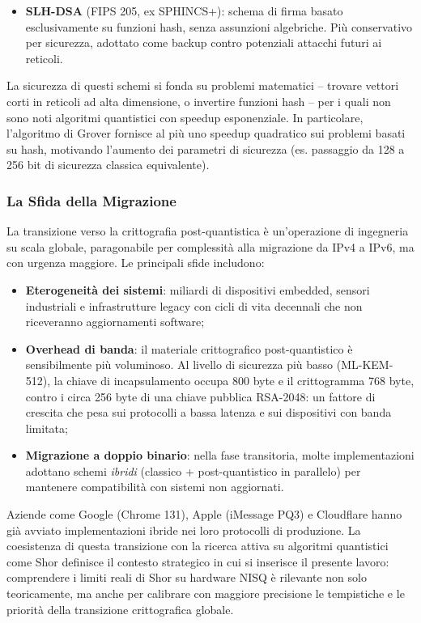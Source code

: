 \begin{onehalfspace}
\begin{itemize}
    \item \textbf{SLH-DSA} (FIPS 205, ex SPHINCS+): schema di firma basato esclusivamente su funzioni hash, senza assunzioni algebriche. Più conservativo per sicurezza, adottato come backup contro potenziali attacchi futuri ai reticoli.
\end{itemize}

La sicurezza di questi schemi si fonda su problemi matematici -- trovare vettori corti in reticoli ad alta dimensione, o invertire funzioni hash -- per i quali non sono noti algoritmi quantistici con speedup esponenziale. In particolare, l'algoritmo di Grover fornisce al più uno speedup quadratico sui problemi basati su hash, motivando l'aumento dei parametri di sicurezza (es. passaggio da 128 a 256 bit di sicurezza classica equivalente).

\subsubsection{La Sfida della Migrazione}

La transizione verso la crittografia post-quantistica è un'operazione di ingegneria su scala globale, paragonabile per complessità alla migrazione da IPv4 a IPv6, ma con urgenza maggiore. Le principali sfide includono:

\begin{itemize}
    \item \textbf{Eterogeneità dei sistemi}: miliardi di dispositivi embedded, sensori industriali e infrastrutture legacy con cicli di vita decennali che non riceveranno aggiornamenti software;
    \item \textbf{Overhead di banda}: il materiale crittografico post-quantistico è sensibilmente più voluminoso. Al livello di sicurezza più basso (ML-KEM-512), la chiave di incapsulamento occupa 800 byte e il crittogramma 768 byte, contro i circa 256 byte di una chiave pubblica RSA-2048: un fattore di crescita che pesa sui protocolli a bassa latenza e sui dispositivi con banda limitata;
    \item \textbf{Migrazione a doppio binario}: nella fase transitoria, molte implementazioni adottano schemi \textit{ibridi} (classico + post-quantistico in parallelo) per mantenere compatibilità con sistemi non aggiornati.
\end{itemize}

Aziende come Google (Chrome 131), Apple (iMessage PQ3) \cite{apple_pq3_2024} e Cloudflare hanno già avviato implementazioni ibride nei loro protocolli di produzione. La coesistenza di questa transizione con la ricerca attiva su algoritmi quantistici come Shor definisce il contesto strategico in cui si inserisce il presente lavoro: comprendere i limiti reali di Shor su hardware NISQ è rilevante non solo teoricamente, ma anche per calibrare con maggiore precisione le tempistiche e le priorità della transizione crittografica globale.


\end{onehalfspace}
